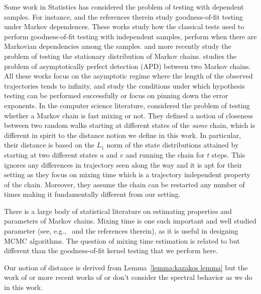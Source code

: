Some work in Statistics has considered the problem of testing with dependent samples. For instance, \cite{Bartlett51, Moore82, GleserM83, MolinaMPV02} and the references therein study goodness-of-fit testing under Markov dependences. These works study how the classical tests used to perform goodness-of-fit testing with independent samples, perform when there are Markovian dependencies among the samples. \cite{TavareA83} and more recently \cite{BarsottiPR16} study the problem of testing the stationary distribution of Markov chains. \cite{Kazakos78} studies the problem of asymptotically perfect detection (APD) between two Markov chains. All these works focus on the asymptotic regime where the length of the observed trajectories tends to infinity, and study the conditions under which hypothesis testing can be performed successfully or focus on pinning down the error exponents. In the computer science literature, \cite{BatuFRSW13} considered the problem of testing whether a Markov chain is fast mixing or not. They defined a notion of closeness between two random walks starting at different states of the \emph{same} chain, which is different in spirit to the distance notion we define in this work. In particular, their distance is based on the $L_1$ norm of the state distributions attained by starting at two different states $u$ and $v$ and running the chain for $t$ steps. This ignores any differences in trajectory seen along the way and it is apt for their setting as they focus on mixing time which is a trajectory independent property of the chain. Moreover, they assume the chain can be restarted any number of times making it fundamentally different from our setting.



There is a large body of statistical literature on estimating properties and parameters of Markov chains. Mixing time is one such important and well studied parameter
(see, e.g.,~\cite{HsuKS15} and the references therein), as it is useful in designing MCMC algorithms. The question of mixing time estimation is related to but different than the goodness-of-fit 
kernel testing that we perform here. 

Our notion of distance is derived from Lemma~\ref{lemma:kazakos lemma} but the work of \cite{Kazakos78} or more recent works of \cite{DaskalakisP17} or \cite{DiakonikolasKS16} don't consider the spectral behavior as we do in this work.